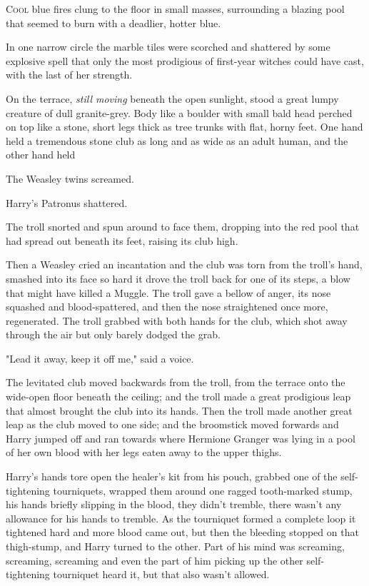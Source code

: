 
\lettrine{C}{ool} blue fires
clung to the floor in small masses, surrounding a blazing pool that seemed to
burn with a deadlier, hotter blue.

In one narrow circle the marble tiles were scorched and shattered by some
explosive spell that only the most prodigious of first-year witches could have
cast, with the last of her strength.

On the terrace, \emph{still moving} beneath the open sunlight, stood a great
lumpy creature of dull granite-grey. Body like a boulder with small bald head
perched on top like a stone, short legs thick as tree trunks with flat, horny
feet. One hand held a tremendous stone club as long and as wide as an adult
human, and the other hand held 

The Weasley twins screamed.

Harry's Patronus shattered.

The troll snorted and spun around to face them, dropping 
into the red pool that had spread out beneath its feet, raising its club high.

Then a Weasley cried an incantation and the club was torn from the troll's
hand, smashed into its face so hard it drove the troll back for one of its
steps, a blow that might have killed a Muggle. The troll gave a bellow of
anger, its nose squashed and blood-spattered, and then the nose straightened
once more, regenerated. The troll grabbed with both hands for the club, which
shot away through the air but only barely dodged the grab.

"Lead it away, keep it off me," said a voice.

The levitated club moved backwards from the troll, from the terrace onto the
wide-open floor beneath the ceiling; and the troll made a great prodigious leap
that almost brought the club into its hands. Then the troll made another great
leap as the club moved to one side; and the broomstick moved forwards and Harry
jumped off and ran towards where Hermione Granger was lying in a pool of her
own blood with her legs eaten away to the upper thighs.

Harry's hands tore open the healer's kit from his pouch, grabbed one of the
self-tightening tourniquets, wrapped them around one ragged tooth-marked stump,
his hands briefly slipping in the blood, they didn't tremble, there wasn't any
allowance for his hands to tremble. As the tourniquet formed a complete loop it
tightened hard and more blood came out, but then the bleeding stopped on that
thigh-stump, and Harry turned to the other. Part of his mind was screaming,
screaming, screaming and even the part of him picking up the other
self-tightening tourniquet heard it, but that also wasn't allowed.

